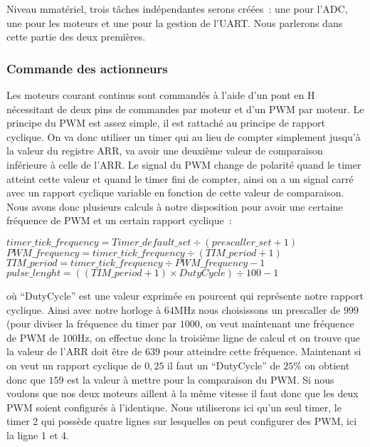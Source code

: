 \documentclass{article}
\begin{document}
Niveau mmatériel, trois tâches indépendantes serons créées~: une pour l'ADC, une pour les moteurs et une pour la gestion de l'UART. Nous parlerons dans cette partie des deux premières.

\subsubsection{Commande des actionneurs}

Les moteurs courant continus sont commandés à l'aide d'un pont en H nécessitant de deux pins de commandes par moteur et d'un PWM par moteur. Le principe du PWM est assez simple, il est rattaché au principe de rapport cyclique. On va donc utiliser un timer qui au lieu de compter simplement jusqu'à la valeur du registre ARR, va avoir une deuxième valeur de comparaison inférieure à celle de l'ARR. Le signal du PWM change de polarité quand le timer atteint cette valeur et quand le timer fini de compter, ainsi on a un signal carré avec un rapport cyclique variable en fonction de cette valeur de comparaison. \\

Nous avons donc plusieurs calculs à notre disposition pour avoir une certaine fréquence de PWM et un certain rapport cyclique~:

\begin{center}
  $timer\_tick\_frequency = Timer\_default\_set \div ( prescaller\_set + 1 )$ \\
  $PWM\_frequency = timer\_tick\_frequency \div ( TIM\_period + 1 ) $ \\
  $TIM\_period = timer\_tick\_frequency \div PWM\_frequency - 1 $ \\
  $pulse\_lenght = ((TIM\_period + 1) \times DutyCycle) \div 100 - 1$ \\
\end{center} 

où ``DutyCycle'' est une valeur exprimée en pourcent qui représente notre rapport cyclique. Ainsi avec notre horloge à 64MHz nous choisissons un prescaller de $999$ (pour diviser la fréquence du timer par $1000$, on veut maintenant une fréquence de PWM de 100Hz, on effectue donc la troisième ligne de calcul et on trouve que la valeur de l'ARR doit être de $639$ pour atteindre cette fréquence. Maintenant si on veut un rapport cyclique de $0,25$ il faut un ``DutyCycle'' de $25\%$ on obtient donc que $159$ est la valeur à mettre pour la comparaison du PWM. Si nous voulons que nos deux moteurs aillent à la même vitesse il faut donc que les deux PWM soient configurés à l'identique. Nous utiliserons ici qu'un seul timer, le timer 2 qui possède quatre lignes sur lesquelles on peut configurer des PWM, ici la ligne 1 et 4. \\
\end{document}
